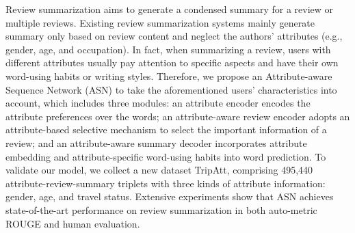 Review summarization aims to generate a condensed summary for a review or multiple reviews. Existing review summarization systems mainly generate summary only based on review content and neglect the authors' attributes (e.g., gender, age, and occupation). In fact, when summarizing a review, users with different attributes usually pay attention to specific aspects and have their own word-using habits or writing styles. Therefore, we propose an Attribute-aware Sequence Network (ASN) to take the aforementioned users' characteristics into account, which includes three modules: an attribute encoder encodes the attribute preferences over the words; an attribute-aware review encoder adopts an attribute-based selective mechanism to select the important information of a review; and an attribute-aware summary decoder incorporates attribute embedding and attribute-specific word-using habits into word prediction. To validate our model, we collect a new dataset TripAtt, comprising 495,440 attribute-review-summary triplets with three kinds of attribute information: gender, age, and travel status. Extensive experiments show that ASN achieves state-of-the-art performance on review summarization in both auto-metric ROUGE and human evaluation.